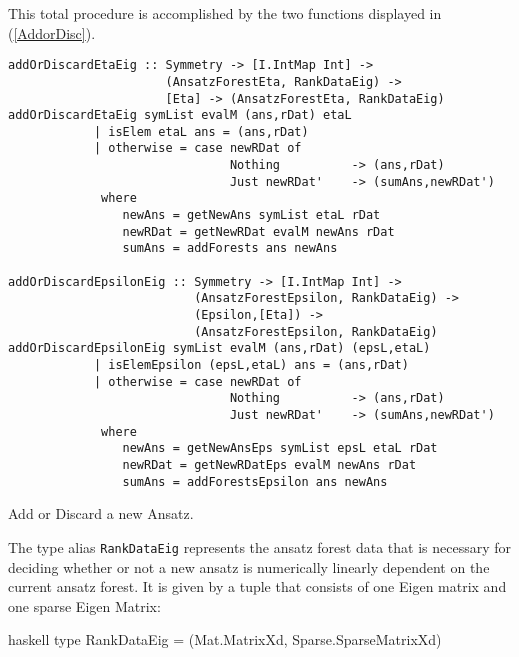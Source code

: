 This total procedure is accomplished by the two functions displayed in (\ref{AddorDisc}).
\begin{listing}[hbt!]
\begin{verbatim}
addOrDiscardEtaEig :: Symmetry -> [I.IntMap Int] ->
                      (AnsatzForestEta, RankDataEig) -> 
                      [Eta] -> (AnsatzForestEta, RankDataEig)
addOrDiscardEtaEig symList evalM (ans,rDat) etaL
            | isElem etaL ans = (ans,rDat)
            | otherwise = case newRDat of
                               Nothing          -> (ans,rDat)
                               Just newRDat'    -> (sumAns,newRDat')
             where
                newAns = getNewAns symList etaL rDat
                newRDat = getNewRDat evalM newAns rDat
                sumAns = addForests ans newAns

addOrDiscardEpsilonEig :: Symmetry -> [I.IntMap Int] ->
                          (AnsatzForestEpsilon, RankDataEig) ->
                          (Epsilon,[Eta]) ->
                          (AnsatzForestEpsilon, RankDataEig)
addOrDiscardEpsilonEig symList evalM (ans,rDat) (epsL,etaL)
            | isElemEpsilon (epsL,etaL) ans = (ans,rDat)
            | otherwise = case newRDat of
                               Nothing          -> (ans,rDat)
                               Just newRDat'    -> (sumAns,newRDat')
             where
                newAns = getNewAnsEps symList epsL etaL rDat
                newRDat = getNewRDatEps evalM newAns rDat
                sumAns = addForestsEpsilon ans newAns
\end{verbatim} 
\caption{Add or Discard a new Ansatz.}\label{AddorDisc}
\end{listing}
The type alias \texttt{RankDataEig} represents the ansatz forest data that is necessary for deciding whether or not a new ansatz is numerically linearly dependent on the current ansatz forest. It is given by a tuple that consists of one Eigen matrix and one sparse Eigen Matrix:
\begin{center}
\begin{cminted}{haskell}
type RankDataEig = (Mat.MatrixXd, Sparse.SparseMatrixXd)
\end{cminted}
\end{center}
